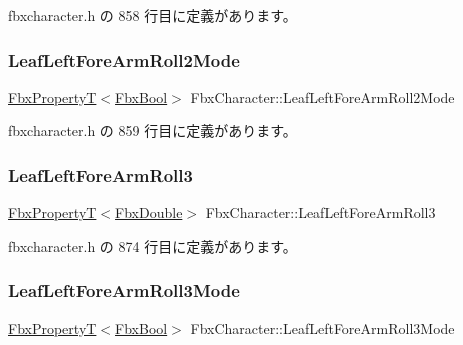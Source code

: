  fbxcharacter.\+h の 858 行目に定義があります。

\mbox{\label{class_fbx_character_aef6a91eaa820543ae718cf34569a99be}} 
\subsubsection{\texorpdfstring{Leaf\+Left\+Fore\+Arm\+Roll2\+Mode}{LeafLeftForeArmRoll2Mode}}
{\footnotesize\ttfamily \hyperlink{class_fbx_property_t}{Fbx\+PropertyT}$<$\hyperlink{fbxtypes_8h_a92e0562b2fe33e76a242f498b362262e}{Fbx\+Bool}$>$ Fbx\+Character\+::\+Leaf\+Left\+Fore\+Arm\+Roll2\+Mode}



 fbxcharacter.\+h の 859 行目に定義があります。

\mbox{\label{class_fbx_character_a8e1ddd422cfd58cce77f5f165faf6471}} 
\subsubsection{\texorpdfstring{Leaf\+Left\+Fore\+Arm\+Roll3}{LeafLeftForeArmRoll3}}
{\footnotesize\ttfamily \hyperlink{class_fbx_property_t}{Fbx\+PropertyT}$<$\hyperlink{fbxtypes_8h_a171e72a1c46fc15c1a6c9c31948c1c5b}{Fbx\+Double}$>$ Fbx\+Character\+::\+Leaf\+Left\+Fore\+Arm\+Roll3}



 fbxcharacter.\+h の 874 行目に定義があります。

\mbox{\label{class_fbx_character_a6b289c53b3986edf68f17a0e8c221e89}} 
\subsubsection{\texorpdfstring{Leaf\+Left\+Fore\+Arm\+Roll3\+Mode}{LeafLeftForeArmRoll3Mode}}
{\footnotesize\ttfamily \hyperlink{class_fbx_property_t}{Fbx\+PropertyT}$<$\hyperlink{fbxtypes_8h_a92e0562b2fe33e76a242f498b362262e}{Fbx\+Bool}$>$ Fbx\+Character\+::\+Leaf\+Left\+Fore\+Arm\+Roll3\+Mode}



